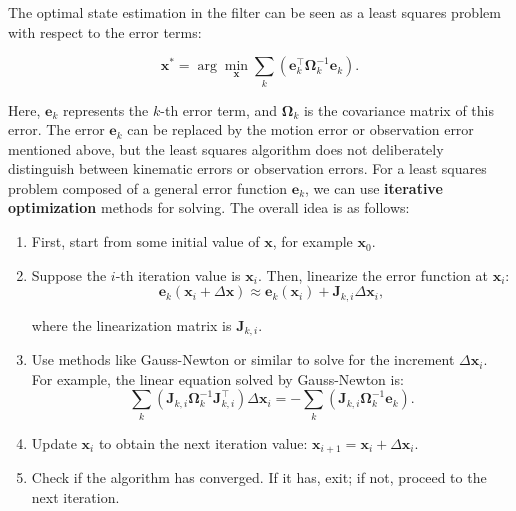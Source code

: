 The optimal state estimation in the filter can be seen as a least squares problem with respect to the error terms:

\begin{equation}
	\mathbf{x}^* = \arg \min_{\mathbf{x}}  \sum_{k} \left( \mathbf{e}_k^\top \boldsymbol{\Omega}_k^{-1} \mathbf{e}_k \right).
\end{equation}

Here, $\mathbf{e}_k$ represents the $k$-th error term, and $\boldsymbol{\Omega}_k$ is the covariance matrix of this error. The error $\mathbf{e}_k$ can be replaced by the motion error or observation error mentioned above, but the least squares algorithm does not deliberately distinguish between kinematic errors or observation errors. For a least squares problem composed of a general error function $\mathbf{e}_k$, we can use \textbf{iterative optimization} methods for solving. The overall idea is as follows:

\begin{enumerate}
\item First, start from some initial value of $\mathbf{x}$, for example $\mathbf{x}_0$.
\item Suppose the $i$-th iteration value is $\mathbf{x}_i$. Then, linearize the error function at $\mathbf{x}_i$:
\begin{equation}
	\mathbf{e}_k(\mathbf{x}_i + \Delta \mathbf{x}) \approx \mathbf{e}_k (\mathbf{x}_i) + \mathbf{J}_{k,i} \Delta \mathbf{x}_i ,
\end{equation}

where the linearization matrix is $\mathbf{J}_{k,i}$.
\item Use methods like Gauss-Newton or similar to solve for the increment $\Delta \mathbf{x}_i$. For example, the linear equation solved by Gauss-Newton is:
\begin{equation}
	\sum_k (\mathbf{J}_{k,i} \boldsymbol{\Omega}_k^{-1} \mathbf{J}_{k,i}^\top) \Delta \mathbf{x}_i = - \sum_k (\mathbf{J}_{k,i} \boldsymbol{\Omega}_k^{-1} \mathbf{e}_k).
\end{equation}

\item Update $\mathbf{x}_i$ to obtain the next iteration value: $\mathbf{x}_{i+1} = \mathbf{x}_i + \Delta \mathbf{x}_i$.
\item Check if the algorithm has converged. If it has, exit; if not, proceed to the next iteration.

\end{enumerate}

